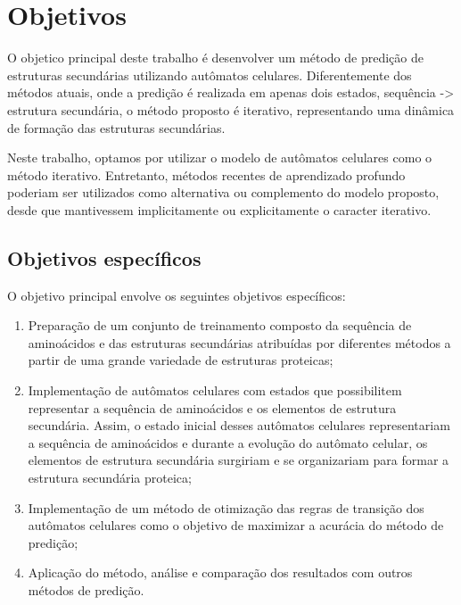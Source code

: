 \chapter{Objetivos}

O objetico principal deste trabalho é desenvolver um método de predição de estruturas secundárias utilizando autômatos celulares. Diferentemente dos métodos atuais, onde a predição é realizada em apenas dois estados, sequência -> estrutura secundária, o método proposto é iterativo, representando uma dinâmica de formação das estruturas secundárias. 

Neste trabalho, optamos por utilizar o modelo de autômatos celulares como o método iterativo. Entretanto, métodos recentes de aprendizado profundo poderiam ser utilizados como alternativa ou complemento do modelo proposto, desde que mantivessem implicitamente ou explicitamente o caracter iterativo. 

\section{Objetivos específicos}

O objetivo principal envolve os seguintes objetivos específicos:

\begin{enumerate}
	\item Preparação de um conjunto de treinamento composto da sequência de aminoácidos e das estruturas secundárias atribuídas por diferentes métodos a partir de uma grande variedade de estruturas proteicas;
	\item Implementação de autômatos celulares com estados que possibilitem representar a sequência de aminoácidos e os elementos de estrutura secundária. Assim, o estado inicial desses autômatos celulares representariam a sequência de aminoácidos e durante a evolução do autômato celular, os elementos de estrutura secundária surgiriam e se organizariam para formar a estrutura secundária proteica;
	\item Implementação de um método de otimização das regras de transição dos autômatos celulares como o objetivo de maximizar a acurácia do método de predição;
	\item Aplicação do método, análise e comparação dos resultados com outros métodos de predição.
\end{enumerate}


